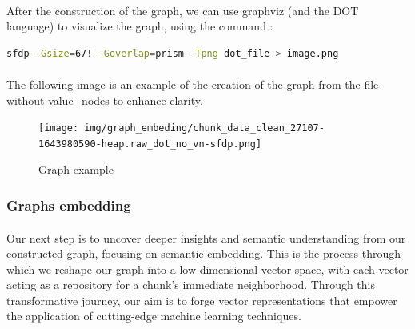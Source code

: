         \paragraph{}After the construction of the graph, we can use graphviz (and the DOT language)\cite{farin_graphviz_2004} to visualize the graph, using the command :
        \begin{lstlisting}[language=bash]
            sfdp -Gsize=67! -Goverlap=prism -Tpng dot_file > image.png
        \end{lstlisting}

        \paragraph{}The following image is an example of the creation of the graph from the file  without \glspl{value_node} to enhance clarity.
        \begin{figure}[H]
            \centering
            \texttt{[image: img/graph\_embeding/chunk\_data\_clean\_27107-1643980590-heap.raw\_dot\_no\_vn-sfdp.png]}
            \caption{Graph example}
            \label{fig:graph_embedding:graph_example}
        \end{figure}

    \subsubsection{Graphs embedding}

        \paragraph{}Our next step is to uncover deeper insights and semantic understanding from our constructed graph, focusing on semantic embedding. This is the process through which we reshape our graph into a low-dimensional vector space, with each vector acting as a repository for a \gls{chunk}'s immediate neighborhood. Through this transformative journey, our aim is to forge vector representations that empower the application of cutting-edge machine learning techniques.

